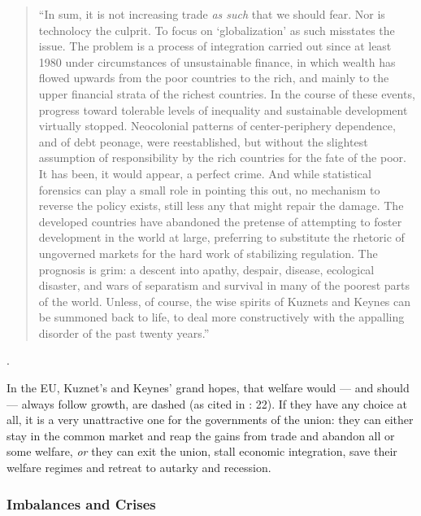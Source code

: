 {\begin{quote}
		``In sum, it is not increasing trade \emph{as such} that we should fear. Nor is technolocy the culprit. To focus on `globalization' as such misstates the issue. The problem is a process of integration carried out since at least 1980 under circumstances of unsustainable finance, in which wealth has flowed upwards from the poor countries to the rich, and mainly to the upper financial strata of the richest countries. In the course of these events, progress toward tolerable levels of inequality and sustainable development virtually stopped. Neocolonial patterns of center-periphery dependence, and of debt peonage, were reestablished, but without the slightest assumption of responsibility by the rich countries for the fate of the poor. It has been, it would appear, a perfect crime. And while statistical forensics can play a small role in pointing this out, no mechanism to reverse the policy exists, still less any that might repair the damage. The developed countries have abandoned the pretense of attempting to foster development in the world at large, preferring to substitute the rhetoric of ungoverned markets for the hard work of stabilizing regulation. The prognosis is grim: a descent into apathy, despair, disease, ecological disaster, and wars of separatism and survival in many of the poorest parts of the world. Unless, of course, the wise spirits of Kuznets and Keynes can be summoned back to life, to deal more constructively with the appalling disorder of the past twenty years.''
	\end{quote}}.

In the \gls{EU}, Kuznet's and Keynes' grand hopes, that welfare would --- and should --- always follow growth, are dashed (as cited in \citealt{Galbraith2002a}: 22). If they have any choice at all, it is a very unattractive one for the governments of the union: they can either stay in the common market and reap the gains from trade and abandon all or some welfare, \emph{or} they can exit the union, stall economic integration, save their welfare regimes and retreat to autarky and recession.

\subsubsection{Imbalances and Crises} \label{sec:imbalances}


